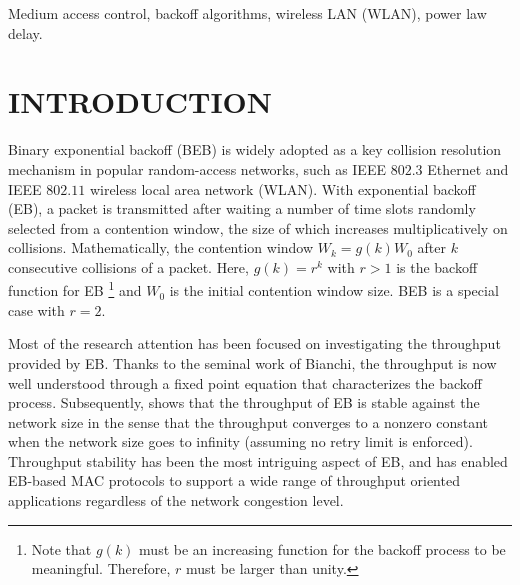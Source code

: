 \documentclass[journal]{IEEEtran}
\begin{document}
\begin{IEEEkeywords}
Medium access control, backoff algorithms, wireless LAN (WLAN), power law delay.
\end{IEEEkeywords}


\section{INTRODUCTION}
Binary exponential backoff (BEB) is widely adopted as a key collision resolution mechanism in popular random-access networks, such as IEEE $802.3$ Ethernet and IEEE $802.11$ wireless local area network (WLAN). With exponential backoff (EB), a packet is transmitted after waiting a number of time slots randomly selected from a contention window, the size of which increases multiplicatively on collisions. Mathematically, the contention window $W_k=g(k)W_0$ after $k$ consecutive collisions of a packet. Here, $g(k)=r^k$ with $r>1$ is the backoff function for EB \footnote{Note that $g(k)$ must be an increasing function for the backoff process to be meaningful. Therefore, $r$ must be larger than unity.} and $W_0$ is the initial contention window size. BEB is a special case with $r=2$.

Most of the research attention has been focused on investigating the throughput provided by EB. Thanks to the seminal work of Bianchi\cite{2000:Bianchi}, the throughput is now well understood through a fixed point equation that characterizes the backoff process. Subsequently, \cite{2005:Kwok} shows that the throughput of EB is stable against the network size in the sense that the throughput converges to a nonzero constant when the network size goes to infinity (assuming no retry limit is enforced). Throughput stability has been the most intriguing aspect of EB, and has enabled EB-based MAC protocols to support a wide range of throughput oriented applications regardless of the network congestion level.
\end{document}

